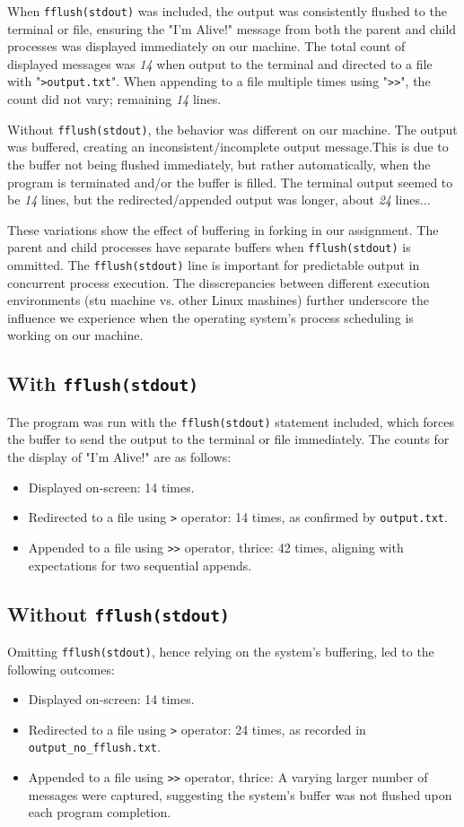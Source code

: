 \documentclass[12pt]{article}
\begin{document}
When \texttt{fflush(stdout)} was included, the output was consistently flushed to the terminal or file, ensuring the "I'm Alive!" message from both the parent and child processes was displayed immediately on our machine. The total count of displayed messages was \textit{14} when output to the terminal and directed to a file with "\texttt{>output.txt}". When appending to a file multiple times using "\texttt{>>}", the count did not vary; remaining \textit{14} lines.

Without \texttt{fflush(stdout)}, the behavior was different on our machine. The output was buffered, creating an inconsistent/incomplete output message.This is due to the buffer not being flushed immediately, but rather automatically, when the program is terminated and/or the buffer is filled. The terminal output seemed to be \textit{14} lines, but the redirected/appended output was longer, about \textit{24} lines...

These variations show the effect of buffering in forking in our assignment. The parent and child processes have separate buffers when \texttt{fflush(stdout)} is ommitted. The \texttt{fflush(stdout)} line is important for predictable output in concurrent process execution. The disscrepancies between different execution environments (stu machine vs. other Linux mashines) further underscore the influence we experience when the operating system's process scheduling is working on our machine.

\subsection{With \texttt{fflush(stdout)}}
The program was run with the \texttt{fflush(stdout)} statement included, which forces the buffer to send the output to the terminal or file immediately. The counts for the display of "I'm Alive!" are as follows:
\begin{itemize}
  \item Displayed on-screen: 14 times.
  \item Redirected to a file using \texttt{>} operator: 14 times, as confirmed by \texttt{output.txt}.
  \item Appended to a file using \texttt{>>} operator, thrice: 42 times, aligning with expectations for two sequential appends.
\end{itemize}

\subsection{Without \texttt{fflush(stdout)}}
Omitting \texttt{fflush(stdout)}, hence relying on the system's buffering, led to the following outcomes:
\begin{itemize}
  \item Displayed on-screen: 14 times.
  \item Redirected to a file using \texttt{>} operator: 24 times, as recorded in \texttt{output\_no\_fflush.txt}.
  \item Appended to a file using \texttt{>>} operator, thrice: A varying larger number of messages were captured, suggesting the system's buffer was not flushed upon each program completion.
\end{itemize}
\end{document}
